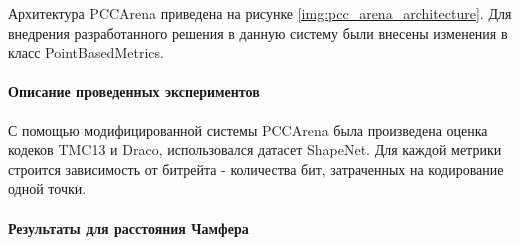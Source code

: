 \documentclass[a4paper,12pt]{extreport}
\begin{document}
Архитектура PCCArena приведена на рисунке \ref{img:pcc_arena_architecture}. Для
внедрения разработанного решения в данную систему были внесены изменения в класс
PointBasedMetrics.

\paragraph{Описание проведенных экспериментов}

С помощью модифицированной системы PCCArena была произведена оценка кодеков
TMC13 и Draco, использовался датасет ShapeNet. Для каждой метрики строится
зависимость от битрейта - количества бит, затраченных на кодирование одной
точки.

\paragraph{Результаты для расстояния Чамфера}
\end{document}
